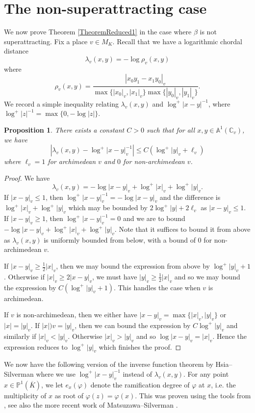 \documentclass[10pt, reqno]{amsart}
\newcommand{\bb}{\mathbb}
\newcommand{\vphi}{\varphi}
\newcommand{\ovl}{\overline}
\numberwithin{theorem}{section}
\newtheorem{proposition}[theorem]{Proposition}
\numberwithin{equation}{section}
\numberwithin{example}{section}
\numberwithin{definition}{section}
\begin{document}
 


\section{The non-superattracting case} \label{sec: NonSuperAttracting}
We now prove Theorem \ref{TheoremReduced1} in the case where $\beta$ is not superattracting. Fix a place $v \in M_K$. Recall that we have a logarithmic chordal distance 
$$\lambda_v(x,y) = - \log \rho_v(x,y)$$
where
$$\rho_v(x,y) = \frac{|x_0y_1 - x_1y_0|_v}{\max\{|x_0|_v,|x_1|_v\} \max\{|y_0|_v,|y_1|_v\}}.$$
We record a simple inequality relating $\lambda_v(x,y)$ and $\log^+|x-y|^{-1}$, where $\log^+|z|^{-1} = \max\{0, -\log|z|\}$.

\begin{proposition} \label{Distance1}
There exists a constant $C > 0$ such that for all $x,y \in \bb{A}^1(\bb{C}_v)$, we have
$$\left| \lambda_v(x,y) - \log^+|x-y|_v^{-1} \right| \leq C (\log^+|y|_v + \ell_v)$$
where $\ell_v = 1$ for archimedean $v$ and $0$ for non-archimedean $v$.
\end{proposition}

\begin{proof}
We have 
$$\lambda_v(x,y) = -\log |x-y|_v + \log^+|x|_v + \log^+|y|_v.$$
If $|x-y|_v \leq 1$, then $\log^+|x-y|_v^{-1} = - \log |x-y|_v$ and the difference is $\log^+|x|_v + \log^+|y|_v$ which may be bounded by $2 \log^+|y| + 2 \ell_v$ as $|x-y|_v \leq 1$. If $|x-y|_v \geq 1$, then $\log^+|x-y|_v^{-1} = 0$ and we are to bound $-\log |x-y|_v + \log^+|x|_v + \log^+|y|_v$. Note that it suffices to bound it from above as $\lambda_v(x,y)$ is uniformly bounded from below, with a bound of $0$ for non-archimedean $v$. 
\par 
If $|x-y|_v \geq \frac{1}{2} |x|_v$, then we may bound the expression from above by $\log^+|y|_v + 1$. Otherwise if $|x|_v \geq 2|x-y|_v$, we must have $|y|_v \geq \frac{1}{2}|x|_v$ and so we may bound the expression by $C(\log^+|y|_v + 1)$. This handles the case when $v$ is archimedean.
\par 
If $v$ is non-archimedean, then we either have $|x-y|_v = \max\{|x|_v,|y|_v\}$ or $|x| = |y|_v$. If $|x|)v = |y|_v$, then we can bound the expression by $C \log^+|y|_v$ and similarly if $|x|_v < |y|_v$. Otherwise $|x|_v > |y|_v$ and so $\log |x-y|_v = |x|_v$. Hence the expression reduces to $\log^+|y|_v$ which finishes the proof. 
\end{proof}

We now have the following version of the inverse function theorem by Hsia--Silverman \cite[Proposition 7]{HS11} where we use $\log^+|x-y|_v^{-1}$ instead of $\lambda_v(x,y)$. For any point $x \in \bb{P}^1(\ovl{K})$, we let $e_x(\vphi)$ denote the ramification degree of $\vphi$ at $x$, i.e. the multiplicity of $x$ as root of $\vphi(z) = \vphi(x)$. This was proven using the tools from \cite{Sil87}, see also the more recent work of Matsuzawa--Silverman \cite{MS21}. 
\end{document}
